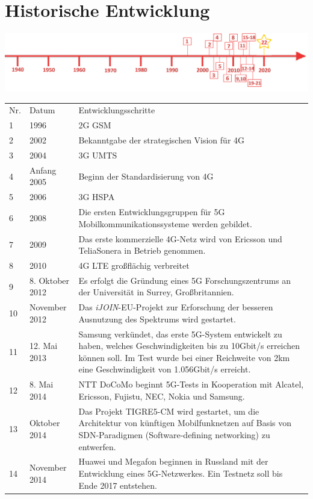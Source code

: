 \section*{Historische Entwicklung}
\includegraphics[width=\textwidth]{Kapitel/5G/Grafiken/Zeitstrahl2}
\par
\noindent
\begin{tabular}{p{1 cm}p{3 cm}p{13.55 cm}}
\rowcolors{2}{}{\topicolor!20}
	Nr. & Datum & Entwicklungsschritte~\cite{5g.1}\\
	1 & 1996 & 2G GSM \\
	2 & 2002 & Bekanntgabe der strategischen Vision für 4G\cite{5g.5} \\
	3 & 2004 & 3G UMTS\\
	4 & Anfang 2005 & Beginn der Standardisierung von 4G\cite{5g.5} \\
	5 & 2006 & 3G HSPA\\
	6 & 2008 & Die ersten Entwicklungsgruppen für 5G Mobilkommunikationssysteme werden gebildet.\\
	7 & 2009 & Das erste kommerzielle 4G-Netz wird von Ericsson und TeliaSonera in Betrieb genommen. \\
	8 & 2010 & 4G LTE großflächig verbreitet \\
	9 & 8. Oktober 2012 & Es erfolgt die Gründung eines 5G Forschungszentrums an der Universität in Surrey, Großbritannien. \\
	10 & November 2012 & Das \textit{iJOIN}-EU-Projekt zur Erforschung der besseren Ausnutzung des Spektrums wird gestartet. \\
	11 & 12. Mai 2013 & Samsung verkündet, das erste 5G-System entwickelt zu haben, welches Geschwindigkeiten bis zu 10Gbit/s erreichen können soll. Im Test wurde bei einer Reichweite von 2km eine Geschwindigkeit von 1.056Gbit/s erreicht. \\
	12 & 8. Mai 2014 & NTT DoCoMo beginnt 5G-Tests in Kooperation mit Alcatel, Ericsson, Fujistu, NEC, Nokia und Samsung. \\
	13 & Oktober 2014 & Das Projekt TIGRE5-CM wird gestartet, um die Architektur von künftigen Mobilfunknetzen auf Basis von SDN-Paradigmen (Software-defining networking) zu entwerfen. \\
	14 & November 2014 & Huawei und Megafon beginnen in Russland mit der Entwicklung eines 5G-Netzwerkes. Ein Testnetz soll bis Ende 2017 entstehen. \\

\end{tabular}
